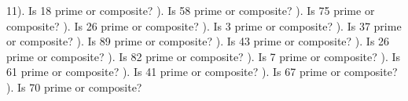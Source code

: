 \documentclass{article}%
\begin{document}
11). Is 18 prime or composite?%
\newline%
\newline%
). Is 58 prime or composite?%
\newline%
\newline%
). Is 75 prime or composite?%
\newline%
\newline%
). Is 26 prime or composite?%
\newline%
\newline%
). Is 3 prime or composite?%
\newline%
\newline%
). Is 37 prime or composite?%
\newline%
\newline%
). Is 89 prime or composite?%
\newline%
\newline%
). Is 43 prime or composite?%
\newline%
\newline%
). Is 26 prime or composite?%
\newline%
\newline%
). Is 82 prime or composite?%
\newline%
\newline%
). Is 7 prime or composite?%
\newline%
\newline%
). Is 61 prime or composite?%
\newline%
\newline%
). Is 41 prime or composite?%
\newline%
\newline%
). Is 67 prime or composite?%
\newline%
\newline%
). Is 70 prime or composite?%
\newline%
\end{document}

